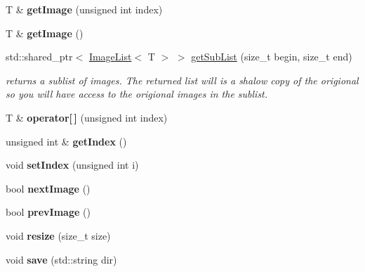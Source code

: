 \begin{DoxyCompactItemize}
\item 
T \& {\bfseries get\+Image} (unsigned int index)\hypertarget{classImageList_ae54a4a122c16cfbb0f9de6d696844b91}{}\label{classImageList_ae54a4a122c16cfbb0f9de6d696844b91}

\item 
T \& {\bfseries get\+Image} ()\hypertarget{classImageList_abf66959c2cffacd6cff55f555b5a0551}{}\label{classImageList_abf66959c2cffacd6cff55f555b5a0551}

\item 
std\+::shared\+\_\+ptr$<$ \hyperlink{classImageList}{Image\+List}$<$ T $>$ $>$ \hyperlink{classImageList_a9c64bdc0f3aaf5940318a06484ce026f}{get\+Sub\+List} (size\+\_\+t begin, size\+\_\+t end)
\begin{DoxyCompactList}\small\item\em returns a sublist of images. The returned list will is a shalow copy of the origional so you will have access to the origional images in the sublist. \end{DoxyCompactList}\item 
T \& {\bfseries operator\mbox{[}$\,$\mbox{]}} (unsigned int index)\hypertarget{classImageList_a5b0d566aade2b0af6bfcb82d5d82af4c}{}\label{classImageList_a5b0d566aade2b0af6bfcb82d5d82af4c}

\item 
unsigned int \& {\bfseries get\+Index} ()\hypertarget{classImageList_a9b9769c365a2ac5934c70d642b17eaac}{}\label{classImageList_a9b9769c365a2ac5934c70d642b17eaac}

\item 
void {\bfseries set\+Index} (unsigned int i)\hypertarget{classImageList_a0d9f0ce8e358968899bf15266e33cac7}{}\label{classImageList_a0d9f0ce8e358968899bf15266e33cac7}

\item 
bool {\bfseries next\+Image} ()\hypertarget{classImageList_a6a785b839c0440fcbd339402e2144a9c}{}\label{classImageList_a6a785b839c0440fcbd339402e2144a9c}

\item 
bool {\bfseries prev\+Image} ()\hypertarget{classImageList_af1005ad543dad08a543fc430b6edf183}{}\label{classImageList_af1005ad543dad08a543fc430b6edf183}

\item 
void {\bfseries resize} (size\+\_\+t size)\hypertarget{classImageList_a4b61745c57e406f90f1ca90dd06a015b}{}\label{classImageList_a4b61745c57e406f90f1ca90dd06a015b}

\item 
void {\bfseries save} (std\+::string dir)\hypertarget{classImageList_a86b8ee285adc50f1b4061a0744abbb69}{}\label{classImageList_a86b8ee285adc50f1b4061a0744abbb69}


\end{DoxyCompactItemize}
